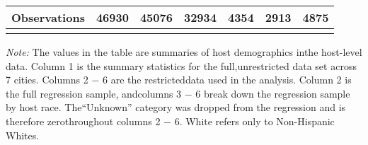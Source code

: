 \begin{table}[htbp]
\begin{center}
\begin{tabular}{l c | c | c c c c}
Observations & 46930 & 45076 & 32934 & 4354 & 2913 & 4875 
\\
\hline\hline\noalign{\smallskip} \end{tabular} 
\begin{minipage}{6in}
{\it Note:} The values in the table are summaries of host demographics inthe host-level data. Column 1 is the summary statistics for the full,unrestricted data set across 7 cities. Columns 2 $-$ 6 are the restricteddata used in the analysis. Column 2 is the full regression sample, andcolumns 3 $-$ 6 break down the regression sample by host race. The“Unknown” category was dropped from the regression and is therefore zerothroughout columns 2 $-$ 6. White refers only to Non-Hispanic Whites.\end{minipage}
\end{center}
\end{table}
